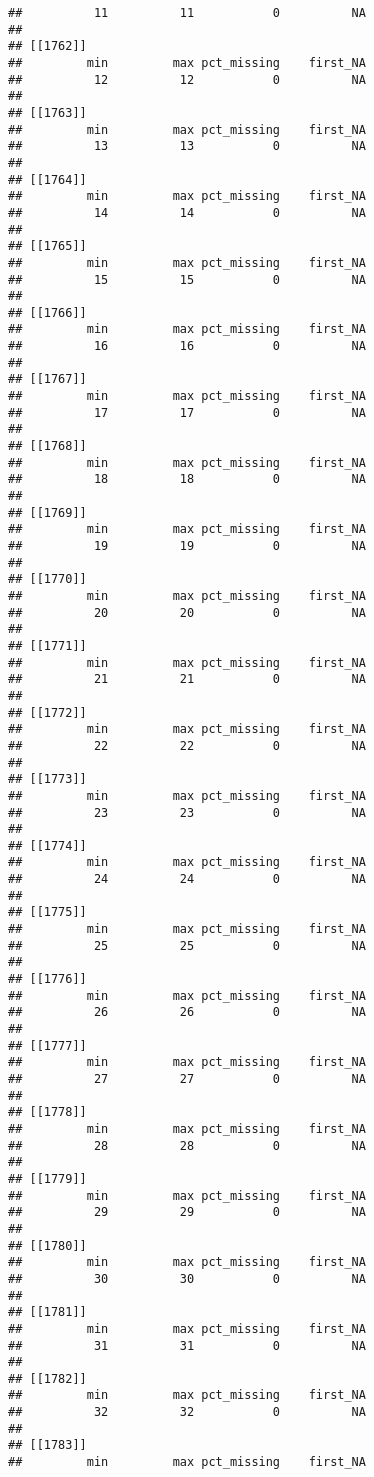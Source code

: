 \documentclass[
]{article}
\begin{document}
\begin{verbatim}
##          11          11           0          NA 
## 
## [[1762]]
##         min         max pct_missing    first_NA 
##          12          12           0          NA 
## 
## [[1763]]
##         min         max pct_missing    first_NA 
##          13          13           0          NA 
## 
## [[1764]]
##         min         max pct_missing    first_NA 
##          14          14           0          NA 
## 
## [[1765]]
##         min         max pct_missing    first_NA 
##          15          15           0          NA 
## 
## [[1766]]
##         min         max pct_missing    first_NA 
##          16          16           0          NA 
## 
## [[1767]]
##         min         max pct_missing    first_NA 
##          17          17           0          NA 
## 
## [[1768]]
##         min         max pct_missing    first_NA 
##          18          18           0          NA 
## 
## [[1769]]
##         min         max pct_missing    first_NA 
##          19          19           0          NA 
## 
## [[1770]]
##         min         max pct_missing    first_NA 
##          20          20           0          NA 
## 
## [[1771]]
##         min         max pct_missing    first_NA 
##          21          21           0          NA 
## 
## [[1772]]
##         min         max pct_missing    first_NA 
##          22          22           0          NA 
## 
## [[1773]]
##         min         max pct_missing    first_NA 
##          23          23           0          NA 
## 
## [[1774]]
##         min         max pct_missing    first_NA 
##          24          24           0          NA 
## 
## [[1775]]
##         min         max pct_missing    first_NA 
##          25          25           0          NA 
## 
## [[1776]]
##         min         max pct_missing    first_NA 
##          26          26           0          NA 
## 
## [[1777]]
##         min         max pct_missing    first_NA 
##          27          27           0          NA 
## 
## [[1778]]
##         min         max pct_missing    first_NA 
##          28          28           0          NA 
## 
## [[1779]]
##         min         max pct_missing    first_NA 
##          29          29           0          NA 
## 
## [[1780]]
##         min         max pct_missing    first_NA 
##          30          30           0          NA 
## 
## [[1781]]
##         min         max pct_missing    first_NA 
##          31          31           0          NA 
## 
## [[1782]]
##         min         max pct_missing    first_NA 
##          32          32           0          NA 
## 
## [[1783]]
##         min         max pct_missing    first_NA 

\end{verbatim}
\end{document}
